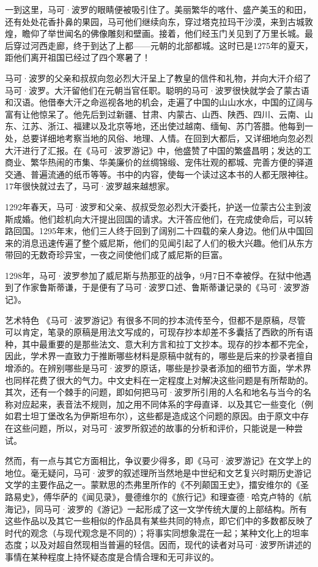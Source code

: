\documentclass[12pt,UTF8]{ctexbook}
\begin{document}
一到这里，马可·波罗的眼睛便被吸引住了。美丽繁华的喀什、盛产美玉的和田，还有处处花香扑鼻的果园，马可他们继续向东，穿过塔克拉玛干沙漠，来到古城敦煌，瞻仰了举世闻名的佛像雕刻和壁画。接着，他们经玉门关见到了万里长城。最后穿过河西走廊，终于到达了上都——元朝的北部都城。这时已是1275年的夏天，距他们离开祖国已经过了四个寒暑了！

马可·波罗的父亲和叔叔向忽必烈大汗呈上了教皇的信件和礼物，并向大汗介绍了马可·波罗。大汗留他们在元朝当官任职。聪明的马可·波罗很快就学会了蒙古语和汉语。他借奉大汗之命巡视各地的机会，走遍了中国的山山水水，中国的辽阔与富有让他惊呆了。他先后到过新疆、甘肃、内蒙古、山西、陕西、四川、云南、山东、江苏、浙江、福建以及北京等地，还出使过越南、缅甸、苏门答腊。他每到一处，总要详细地考察当地的风俗、地理、人情。在回到大都后，又详细地向忽必烈大汗进行了汇报。在《马可·波罗游记》中，他盛赞了中国的繁盛昌明；发达的工商业、繁华热闹的市集、华美廉价的丝绸锦缎、宠伟壮观的都城、完善方便的驿道交通、普遍流通的纸币等等。书中的内容，使每一个读过这本书的人都无限神往。17年很快就过去了，马可·波罗越来越想家。

1292年春天，马可·波罗和父亲、叔叔受忽必烈大汗委托，护送一位蒙古公主到波斯成婚。他们趁机向大汗提出回国的请求。大汗答应他们，在完成使命后，可以转路回国。1295年末，他们三人终于回到了阔别二十四载的亲人身边。他们从中国回来的消息迅速传遍了整个威尼斯，他们的见闻引起了人们的极大兴趣。他们从东方带回的无数奇珍异宝，一夜之间使他们成了威尼斯的巨富。

1298年，马可·波罗参加了威尼斯与热那亚的战争，9月7日不幸被俘。在狱中他遇到了作家鲁斯蒂谦，于是便有了马可·波罗口述、鲁斯蒂谦记录的《马可·波罗游记》。

艺术特色
《马可·波罗游记》有很多不同的抄本流传至今，但都不是原稿，尽管可以肯定，笔录的原稿是用法文写成的，可现存抄本却差不多囊括了西欧的所有语种，其中最重要的是那些法文、意大利方言和拉丁文抄本。现存的抄本都不完全，因此，学术界一直致力于推断哪些材料是原稿中就有的，哪些是后来的抄录者擅自增添的。在辨别哪些是马可·波罗的原话，哪些是抄录者添加的细节方面，学术界也同样花费了很大的气力。中文史料在一定程度上对解决这些问题是有所帮助的。其次，还有一个棘手的问题，即如何把马可·波罗所引用的人名和地名与当今的名称对应起来，表音法不规则，加之用不同体系的字母直译．以及其它一些变化（例如君士坦丁堡改名为伊斯坦布尔），这些都是造成这个问题的原因。由于原文中存在这些问题，所以，对马可·波罗所叙述的故事的分析和评价，只能说是一种尝试。

然而，有一点与其它方面相比，争议要少得多，即《马可·波罗游记》在文学上的地位。毫无疑问，马可·波罗的叙述理所当然地是中世纪和文艺复兴时期历史游记文学的主要作品之一。蒙默思的杰弗里所作的《不列颠国王史》，擂安维尔的《圣路易史》，傅华萨的《闻见录》，曼德维尔的《旅行记》和理查德·哈克卢特的《航海记》，同马可·波罗的《游记》一起形成了这一文学传统大厦的上部结构。所有这些作品以及其它一些相似的作品具有某些共同的特点，即它们中的多数都反映了时代的观念（与现代观念是不同的）；将事实同想象混在一起；某种文化上的坦率态度；以及对超自然现相当普遍的轻信。因而，现代的读者对马可·波罗所讲述的事情在某种程度上持怀疑态度是合情合理和无可非议的。
\end{document}
